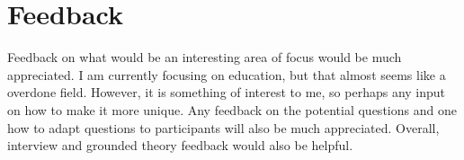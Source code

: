 \chapter{Feedback}\label{C:feedback}

Feedback on what would be an interesting area of focus would be much appreciated. I am currently focusing on education, but that almost seems like a overdone field. However, it is something of interest to me, so perhaps any input on how to make it more unique. Any feedback on the potential questions and one how to adapt questions to participants will also be much appreciated. Overall, interview and grounded theory feedback would also be helpful. 
